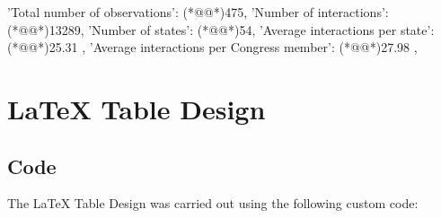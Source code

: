 \documentclass[11pt]{article}
\begin{document}
\begin{codeoutput}
{
    'Total number of observations': (*@@*)475,
    'Number of interactions': (*@@*)13289,
    'Number of states': (*@@*)54,
    'Average interactions per state': (*@@*)25.31             ,
    'Average interactions per Congress member': (*@@*)27.98            ,
}
\end{codeoutput}

\section{LaTeX Table Design}
\subsection{{Code}}
The LaTeX Table Design was carried out using the following custom code:
\end{document}
